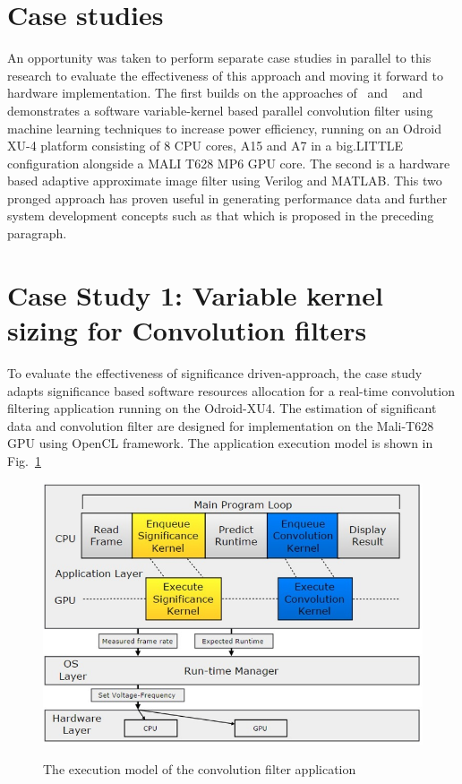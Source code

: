 \documentclass[journal]{IEEEtran}
\begin{document}
\section{Case studies}
An opportunity was taken to perform separate case studies in parallel to this research to evaluate the effectiveness of  this approach and moving it forward to hardware implementation. 
The first builds on the approaches of~\cite{Totoni2013} and ~\cite{Bui2017} and demonstrates a software variable-kernel based parallel convolution filter using machine learning techniques to increase power efficiency, running on an Odroid XU-4 platform consisting of 8 CPU cores, A15 and A7 in a big.LITTLE configuration alongside a MALI T628 MP6 GPU core. The second is a hardware based adaptive approximate image filter using Verilog and MATLAB. This two pronged approach has proven useful in generating performance data and further system development concepts such as that which is proposed in the preceding paragraph.

\section{Case Study 1: Variable kernel sizing for Convolution filters}
\label{sec:CS1}
 To evaluate the effectiveness of significance driven-approach, the case study adapts significance based software resources allocation for a real-time convolution filtering application running on the Odroid-XU4. The estimation of significant data and convolution filter are designed for implementation on the Mali-T628 GPU using OpenCL framework. The application execution model is shown in Fig.~\ref{fig:ExecModel}
  \begin{figure}[htbp]
  \centering
    \caption{The execution model of the convolution filter application}
    \includegraphics[width=\columnwidth]{OdroidExecutionModel.jpg}
  \label{fig:ExecModel}
\end{figure}
\end{document}
